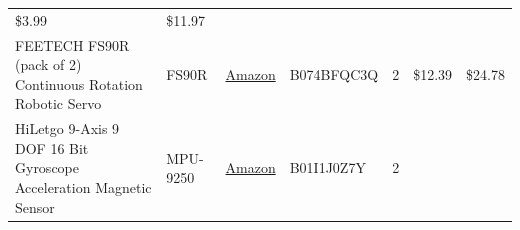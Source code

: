 \documentclass[]{article}
\begin{document}
\begin{longtable}[]{@{}lllllll@{}}
\begin{minipage}[t]{0.06\columnwidth}
\$3.99\strut
\end{minipage} & \begin{minipage}[t]{0.07\columnwidth}\raggedright
\$11.97\strut
\end{minipage}\tabularnewline
\begin{minipage}[t]{0.15\columnwidth}\raggedright
FEETECH FS90R (pack of 2) Continuous Rotation Robotic Servo\strut
\end{minipage} & \begin{minipage}[t]{0.15\columnwidth}\raggedright
FS90R\strut
\end{minipage} & \begin{minipage}[t]{0.10\columnwidth}\raggedright
\href{https://www.amazon.com/gp/product/B074BFQC3Q/ref=oh_aui_detailpage_o06_s00?ie=UTF8\&psc=1}{Amazon}\strut
\end{minipage} & \begin{minipage}[t]{0.17\columnwidth}\raggedright
B074BFQC3Q\strut
\end{minipage} & \begin{minipage}[t]{0.11\columnwidth}\raggedright
2\strut
\end{minipage} & \begin{minipage}[t]{0.06\columnwidth}\raggedright
\$12.39\strut
\end{minipage} & \begin{minipage}[t]{0.07\columnwidth}\raggedright
\$24.78\strut
\end{minipage}\tabularnewline
\begin{minipage}[t]{0.15\columnwidth}\raggedright
HiLetgo 9-Axis 9 DOF 16 Bit Gyroscope Acceleration Magnetic Sensor\strut
\end{minipage} & \begin{minipage}[t]{0.15\columnwidth}\raggedright
MPU-9250\strut
\end{minipage} & \begin{minipage}[t]{0.10\columnwidth}\raggedright
\href{https://www.amazon.com/HiLetgo-Gyroscope-Acceleration-Accelerator-Magnetometer/dp/B01I1J0Z7Y/ref=redir_mobile_desktop?_encoding=UTF8\&dpID=51nl2fcMh6L\&dpPl=1\&keywords=mpu\%209250\&pi=AC_SX236_SY340_QL65\&qid=1512564044\&ref=plSrch\&ref_=mp_s_a_1_3\&sr=8-3}{Amazon}\strut
\end{minipage} & \begin{minipage}[t]{0.17\columnwidth}\raggedright
B01I1J0Z7Y\strut
\end{minipage} & \begin{minipage}[t]{0.11\columnwidth}\raggedright
2\strut
\end{minipage} & \begin{minipage}[t]{0.06\columnwidth}\raggedright

\end{minipage}
\end{longtable}
\end{document}
